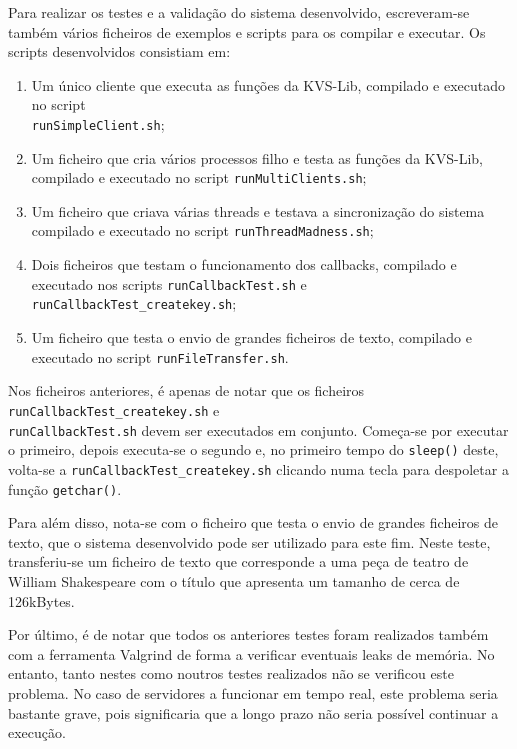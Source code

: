 
Para realizar os testes e a validação do sistema desenvolvido, escreveram-se também vários ficheiros de exemplos e scripts para os compilar e executar. Os scripts desenvolvidos consistiam em:
\begin{enumerate} [noitemsep]
\item Um único cliente que executa as funções da KVS-Lib, compilado e executado no script \\ \texttt{runSimpleClient.sh};
\item Um ficheiro que cria vários processos filho e testa as funções da KVS-Lib, compilado e executado no script \texttt{runMultiClients.sh};
\item Um ficheiro que criava várias threads e testava a sincronização do sistema compilado e executado no script \texttt{runThreadMadness.sh};
\item Dois ficheiros que testam o funcionamento dos callbacks, compilado e executado nos scripts \texttt{runCallbackTest.sh} e \texttt{runCallbackTest\_createkey.sh};
\item Um ficheiro que testa o envio de grandes ficheiros de texto, compilado e executado no script \texttt{runFileTransfer.sh}.
\end{enumerate}

Nos ficheiros anteriores, é apenas de notar que os ficheiros \texttt{runCallbackTest\_createkey.sh} e \\ \texttt{runCallbackTest.sh} devem ser executados em conjunto. Começa-se por executar o primeiro, depois executa-se o segundo e, no primeiro tempo do \texttt{sleep()} deste, volta-se a \texttt{runCallbackTest\_createkey.sh} clicando numa tecla para despoletar a função \texttt{getchar()}.

Para além disso, nota-se com o ficheiro que testa o envio de grandes ficheiros de texto, que o sistema desenvolvido pode ser utilizado para este fim. Neste teste, transferiu-se um ficheiro de texto que corresponde a uma peça de teatro de William Shakespeare com o título  que apresenta um tamanho de cerca de 126kBytes.

Por último, é de notar que todos os anteriores testes foram realizados também com a ferramenta Valgrind de forma a verificar eventuais leaks de memória. No entanto, tanto nestes como noutros testes realizados não se verificou este problema. No caso de servidores a funcionar em tempo real, este problema seria bastante grave, pois significaria que a longo prazo não seria possível continuar a execução.